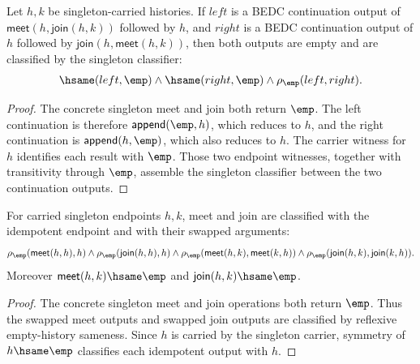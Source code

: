 \begin{theorem}
\label{thm:lattice-singleton-meet-join-continuation-absorption-empty-classifier}
Let $h,k$ be singleton-carried histories. If $left$ is a BEDC continuation
output of $\mathsf{meet}(h,\mathsf{join}(h,k))$ followed by $h$, and $right$
is a BEDC continuation output of $h$ followed by
$\mathsf{join}(h,\mathsf{meet}(h,k))$, then both outputs are empty and are
classified by the singleton classifier:
$$
\hsame(left,\emp)\wedge \hsame(right,\emp)\wedge \rho_{\emp}(left,right).
$$
\end{theorem}
\begin{proof}
The concrete singleton meet and join both return $\emp$. The left
continuation is therefore $\mathsf{append}(\emp,h)$, which reduces to $h$,
and the right continuation is $\mathsf{append}(h,\emp)$, which also reduces
to $h$. The carrier witness for $h$ identifies each result with $\emp$.
Those two endpoint witnesses, together with transitivity through $\emp$,
assemble the singleton classifier between the two continuation outputs.
\end{proof}

\begin{theorem}
\label{thm:lattice-singleton-meet-join-idempotent-comm-classifier}
For carried singleton endpoints $h,k$, meet and join are classified with the
idempotent endpoint and with their swapped arguments:
$$
\rho_{\emp}(\mathsf{meet}(h,h),h)\land
\rho_{\emp}(\mathsf{join}(h,h),h)\land
\rho_{\emp}(\mathsf{meet}(h,k),\mathsf{meet}(k,h))\land
\rho_{\emp}(\mathsf{join}(h,k),\mathsf{join}(k,h)).
$$
Moreover $\mathsf{meet}(h,k)\hsame\emp$ and
$\mathsf{join}(h,k)\hsame\emp$.
\end{theorem}
\begin{proof}
The concrete singleton meet and join operations both return $\emp$. Thus the
swapped meet outputs and swapped join outputs are classified by reflexive
empty-history sameness. Since $h$ is carried by the singleton carrier, symmetry
of $h\hsame\emp$ classifies each idempotent output with $h$.
\end{proof}

